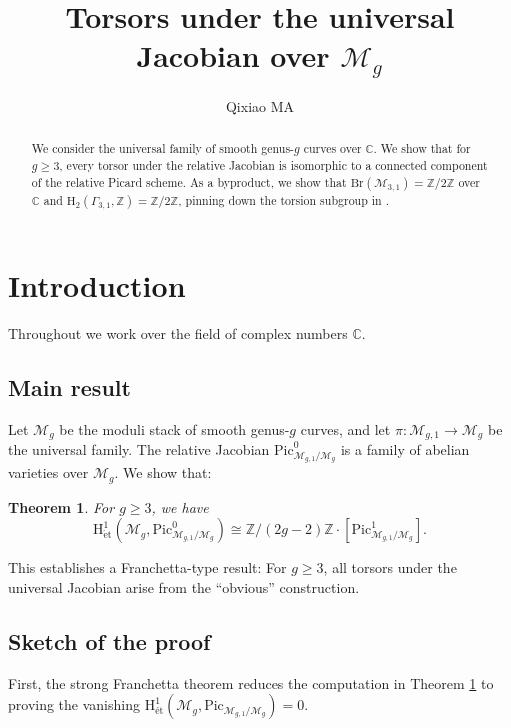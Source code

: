 \documentclass[12pt]{amsart}
\title{Torsors under the universal Jacobian over $\mathcal{M}_g$}
\newtheorem{theorem}{Theorem}
\begin{document}
\author{Qixiao MA}
\address{Institute of Mathematical Sciences, ShanghaiTech University, 201210, Shanghai, China}


\begin{abstract}
We consider the universal family of smooth genus-$g$ curves over $\mathbb{C}$.
We show that for $g\geq3$, every torsor under the relative Jacobian is isomorphic to a connected component of the relative Picard scheme. As a byproduct, we show that $\mathrm{Br}(\mathcal{M}_{3,1})=\mathbb{Z}/2\mathbb{Z}$ over $\mathbb{C}$ and $\mathrm{H}_2(\Gamma_{3,1},\mathbb{Z})=\mathbb{Z}/2\mathbb{Z}$, pinning down the torsion subgroup in \cite[Theorem 1.2]{zbMATH01991000}.

\end{abstract}




\maketitle
\section{Introduction}
Throughout we work over the field of complex numbers $\mathbb{C}$.
\subsection{Main result}Let $\mathcal{M}_{g}$ be the moduli stack of smooth genus-$g$ curves, and let $\pi\colon \mathcal{M}_{g,1}\to \mathcal{M}_{g}$ be the universal family. 
The relative Jacobian $\mathrm{Pic}^0_{\mathcal{M}_{g,1}/\mathcal{M}_{g}}$ is a family of abelian varieties over $\mathcal{M}_g$. We show that:
\begin{theorem}\label{Main_Theorem}For $g\geq3$, we have $$\mathrm{H}^1_{\mathrm{\acute{e}t}}(\mathcal{M}_{g},\mathrm{Pic}^0_{\mathcal{M}_{g,1}/\mathcal{M}_{g}})\cong{\mathbb{Z}}/{(2g-2)\mathbb{Z}}\cdot[\mathrm{Pic}^1_{\mathcal{M}_{g,1}/\mathcal{M}_{g}}].$$
\end{theorem}
This establishes a Franchetta-type result: For $g\geq3$, all torsors under the universal Jacobian arise from the ``obvious'' construction. 


\subsection{Sketch of the proof}First, the strong Franchetta theorem \cite[Theorem 5.1]{zbMATH02078578} reduces the computation in Theorem \ref{Main_Theorem} to proving the vanishing $\mathrm{H}^1_{\textrm{\'et}}(\mathcal{M}_g,\mathrm{Pic}_{\mathcal{M}_{g,1}/\mathcal{M}_g})=0$. 
\end{document}
